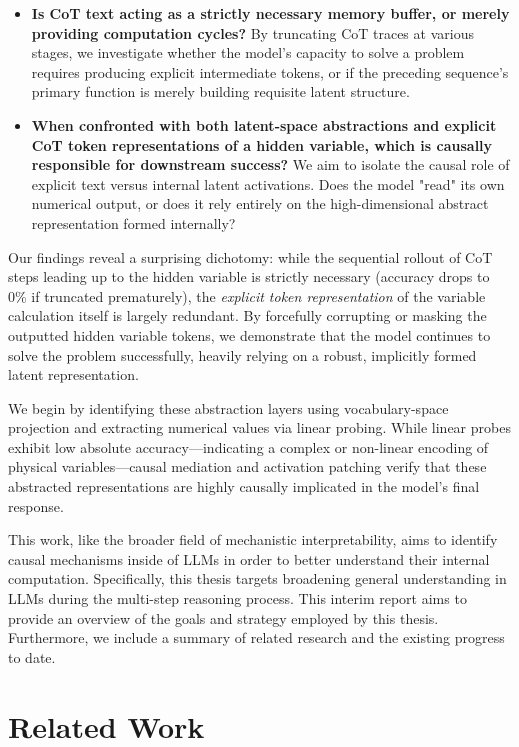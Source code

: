 \documentclass[11pt]{article}
\begin{document}
\begin{itemize}
    \item \textbf{Is CoT text acting as a strictly necessary memory buffer, or merely providing computation cycles?} By truncating CoT traces at various stages, we investigate whether the model's capacity to solve a problem requires producing explicit intermediate tokens, or if the preceding sequence's primary function is merely building requisite latent structure. 
    \item \textbf{When confronted with both latent-space abstractions and explicit CoT token representations of a hidden variable, which is causally responsible for downstream success?} We aim to isolate the causal role of explicit text versus internal latent activations. Does the model "read" its own numerical output, or does it rely entirely on the high-dimensional abstract representation formed internally?
\end{itemize}

Our findings reveal a surprising dichotomy: while the sequential rollout of CoT steps leading up to the hidden variable is strictly necessary (accuracy drops to 0\% if truncated prematurely), the \textit{explicit token representation} of the variable calculation itself is largely redundant. By forcefully corrupting or masking the outputted hidden variable tokens, we demonstrate that the model continues to solve the problem successfully, heavily relying on a robust, implicitly formed latent representation. 

We begin by identifying these abstraction layers using vocabulary-space projection and extracting numerical values via linear probing. While linear probes exhibit low absolute accuracy—indicating a complex or non-linear encoding of physical variables—causal mediation and activation patching verify that these abstracted representations are highly causally implicated in the model's final response.

This work, like the broader field of mechanistic interpretability, aims to identify causal mechanisms inside of LLMs in order to better understand their internal computation. Specifically, this thesis targets broadening general understanding in LLMs during the multi-step reasoning process. This interim report aims to provide an overview of the goals and strategy employed by this thesis. Furthermore, we include a summary of related research and the existing progress to date. 

\section{Related Work}
\end{document}
